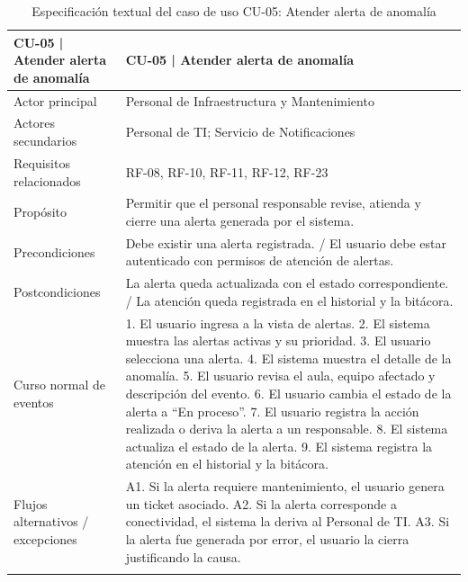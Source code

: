 \begingroup
\small
\begin{longtable}{|P{0.5000}|P{0.5000}|}
\hline
CU-05 | Atender alerta de anomalía & CU-05 | Atender alerta de anomalía \\ \hline
Actor principal & Personal de Infraestructura y Mantenimiento \\ \hline
Actores secundarios & Personal de TI; Servicio de Notificaciones \\ \hline
Requisitos relacionados & RF-08, RF-10, RF-11, RF-12, RF-23 \\ \hline
Propósito & Permitir que el personal responsable revise, atienda y cierre una alerta generada por el sistema. \\ \hline
Precondiciones & Debe existir una alerta registrada. / El usuario debe estar autenticado con permisos de atención de alertas. \\ \hline
Postcondiciones & La alerta queda actualizada con el estado correspondiente. / La atención queda registrada en el historial y la bitácora. \\ \hline
Curso normal de eventos & 1. El usuario ingresa a la vista de alertas. 2. El sistema muestra las alertas activas y su prioridad. 3. El usuario selecciona una alerta. 4. El sistema muestra el detalle de la anomalía. 5. El usuario revisa el aula, equipo afectado y descripción del evento. 6. El usuario cambia el estado de la alerta a ``En proceso''. 7. El usuario registra la acción realizada o deriva la alerta a un responsable. 8. El sistema actualiza el estado de la alerta. 9. El sistema registra la atención en el historial y la bitácora. \\ \hline
Flujos alternativos / excepciones & A1. Si la alerta requiere mantenimiento, el usuario genera un ticket asociado. A2. Si la alerta corresponde a conectividad, el sistema la deriva al Personal de TI. A3. Si la alerta fue generada por error, el usuario la cierra justificando la causa. \\ \hline
\caption{Especificación textual del caso de uso CU-05: Atender alerta de anomalía}
\end{longtable}
\endgroup

